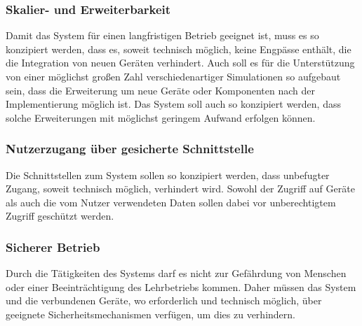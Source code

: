 \subsubsection{Skalier- und Erweiterbarkeit}

Damit das System für einen langfristigen Betrieb geeignet ist, muss es so konzipiert werden, dass es, soweit technisch möglich, keine Engpässe enthält, die die Integration von neuen Geräten verhindert. Auch soll es für die Unterstützung von einer möglichst großen Zahl verschiedenartiger Simulationen so aufgebaut sein, dass die Erweiterung um neue Geräte oder Komponenten nach der Implementierung möglich ist. Das System soll auch so konzipiert werden, dass solche Erweiterungen mit möglichst geringem Aufwand erfolgen können.


\subsubsection{Nutzerzugang über gesicherte Schnittstelle}

Die Schnittstellen zum System sollen so konzipiert werden, dass unbefugter Zugang, soweit technisch möglich, verhindert wird. Sowohl der Zugriff auf Geräte als auch die vom Nutzer verwendeten Daten sollen dabei vor unberechtigtem Zugriff geschützt werden.


\subsubsection{Sicherer Betrieb}

Durch die Tätigkeiten des Systems darf es nicht zur Gefährdung von Menschen oder einer Beeinträchtigung des Lehrbetriebs kommen. Daher müssen das System und die verbundenen Geräte, wo erforderlich und technisch möglich, über geeignete Sicherheitsmechanismen verfügen, um dies zu verhindern.